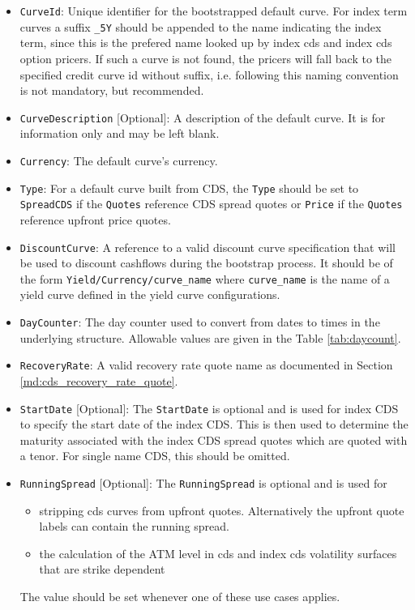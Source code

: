 \begin{itemize}
\item
\lstinline!CurveId!: Unique identifier for the bootstrapped default curve. For index term curves a suffix \lstinline!_5Y! should be appended to the name indicating the index term, since this is the prefered name looked up by index cds and index cds option pricers. If such a curve is not found, the pricers will fall back to the specified credit curve id without suffix, i.e. following this naming convention is not mandatory, but recommended.

\item \lstinline!CurveDescription! [Optional]:
A description of the default curve. It is for information only and may be left blank.

\item \lstinline!Currency!:
The default curve's currency.

\item \lstinline!Type!:
For a default curve built from CDS, the \lstinline!Type! should be set to \lstinline!SpreadCDS! if the \lstinline!Quotes! reference CDS spread quotes or \lstinline!Price! if the \lstinline!Quotes! reference upfront price quotes.

\item \lstinline!DiscountCurve!:
A reference to a valid discount curve specification that will be used to discount cashflows during the bootstrap process. It should be of the form \lstinline!Yield/Currency/curve_name! where \lstinline!curve_name! is the name of a yield curve defined in the yield curve configurations.

\item \lstinline!DayCounter!:
The day counter used to convert from dates to times in the underlying structure. Allowable values are given in the Table \ref{tab:daycount}.

\item \lstinline!RecoveryRate!:
A valid recovery rate quote name as documented in Section \ref{md:cds_recovery_rate_quote}.

\item \lstinline!StartDate! [Optional]:
The \lstinline!StartDate! is optional and is used for index CDS to specify the start date of the index CDS. This is then used to determine the maturity associated with the index CDS spread quotes which are quoted with a tenor. For single name CDS, this should be omitted.

\item \lstinline!RunningSpread! [Optional]:
  The \lstinline!RunningSpread! is optional and is used for
  \begin{itemize}
    \item stripping cds curves from upfront quotes. Alternatively the upfront quote labels can contain the running spread.
    \item the calculation of the ATM level in cds and index cds volatility surfaces that are strike dependent
  \end{itemize}
  The value should be set whenever one of these use cases applies.


\end{itemize}

